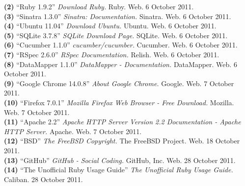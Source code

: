 \documentclass{article}
\begin{document}
\noindent\hangindent=1.4cm
\textbf{(2)} ``Ruby 1.9.2''
\emph{Download Ruby.} Ruby. Web.  6 October 2011. \\

\noindent\hangindent=1.4cm
\textbf{(3)} ``Sinatra 1.3.0''
\emph{Sinatra: Documentation.} Sinatra. Web.  6 October 2011.\\

\noindent\hangindent=1.4cm
\textbf{(4)} ``Ubuntu 11.04''
\emph{Download Ubuntu.} Ubuntu. Web.  6 October 2011.\\

\noindent\hangindent=1.4cm
\textbf{(5)} ``SQLite 3.7.8''
\emph{SQLite Download Page.} SQLite. Web.  6 October 2011.\\

\noindent\hangindent=1.4cm
\textbf{(6)} ``Cucumber 1.1.0''
\emph{cucumber/cucumber.} Cucumber. Web.  6 October 2011.\\

\noindent\hangindent=1.4cm
\textbf{(7)} ``RSpec 2.6.0''
\emph{RSpec Documentation.} Relish. Web.  6 October 2011.\\

\noindent\hangindent=1.4cm
\textbf{(8)} ``DataMapper 1.1.0''
\emph{DataMapper - Documentation.} DataMapper. Web.  6 October 2011.\\

\noindent\hangindent=1.4cm
\textbf{(9)} ``Google Chrome 14.0.8'' 
\emph{About Google Chrome.} Google. Web.  7 October 2011.\\

\noindent\hangindent=1.4cm
\textbf{(10)} ``Firefox 7.0.1''
\emph{Mozilla Firefox Web Browser - Free Download.} Mozilla. Web.  7 October 2011.\\

\noindent\hangindent=1.4cm
\textbf{(11)} ``Apache 2.2''
\emph{Apache HTTP Server Version 2.2 Documentation - Apache HTTP Server.} Apache. Web.  7 October 2011.\\

\noindent\hangindent=1.4cm
\textbf{(12)} ``BSD''
\emph{The FreeBSD Copyright.} The FreeBSD Project. Web. 18 October 2011.\\

\noindent\hangindent=1.4cm
\textbf{(13)} ``GitHub''
\emph{GitHub - Social Coding.} GitHub, Inc. Web. 28 October 2011.\\

\noindent\hangindent=1.4cm
\textbf{(14)} ``The Unofficial Ruby Usage Guide'' \emph{The Unofficial Ruby Usage Guide.} Caliban. 28 October 2011.\\
\end{document}
